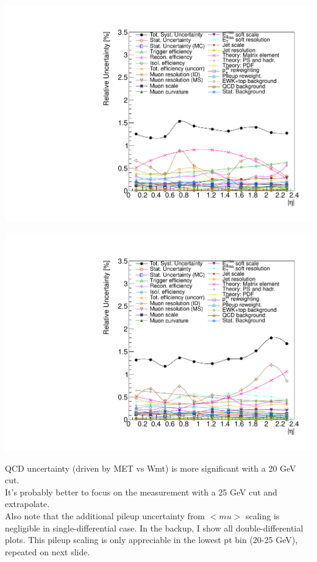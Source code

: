 {
\colb[T]
\centering
{}
\includegraphics[width=1.0\textwidth]{dates/20130602/figures/v26.allqcd/Wmn_SYSTEM_1D_PT20_NEG_Unc_proj}

\centering
{}
\includegraphics[width=1.0\textwidth]{dates/20130602/figures/v26.allqcd/Wmn_SYSTEM_1D_PT20_POS_Unc_proj}
\cole
}

{
QCD uncertainty (driven by MET vs Wmt) is more significant with a 20 GeV cut. \\
It's probably better to focus on the measurement with a 25 GeV cut and extrapolate. \\

Also note that the additional pileup uncertainty from $<mu>$ scaling is negligible in
single-differential case. In the backup, I show all double-differential plots. This pileup
scaling is only appreciable in the lowest pt bin (20-25 GeV), repeated on next slide.
}

